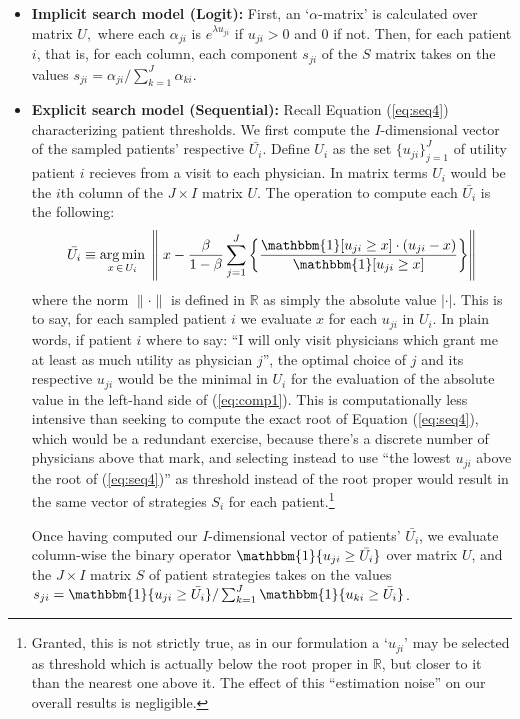 \documentclass[../main.tex]{subfiles}
\begin{document}
\begin{itemize}[itemsep=4pt, topsep=0pt]
    \item \textbf{Implicit search model (Logit):} First, an `$\alpha$-matrix' is calculated over matrix $U,$ where each $\alpha_{ji}$ is $e^{\lambda u_{ji}}$ if $u_{ji} > 0$ and $0$ if not. Then, for each patient $i$, that is, for each column, each component $s_{ji}$ of the $S$ matrix takes on the values $s_{ji} = \alpha_{ji}/\sum_{k = 1}^{J} \alpha_{ki}$.

    \item \textbf{Explicit search model (Sequential):} Recall Equation (\ref{eq:seq4}) characterizing patient thresholds. We first compute the $I$-dimensional vector of the sampled patients' respective $\bar{U_i}$. Define $U_i$ as the set $\{u_{ji}\}_{j=1}^{J}$ of utility patient $i$ recieves from a visit to each physician. In matrix terms $U_i$ would be the $i$th column of the $J \times I$ matrix $U$. The operation to compute each $\bar{U_i}$ is the following: \vspace{-0.5em}
    \begin{equation*}
    \bar{U_i} \equiv \argmin_{x \, \in \, U_i}\; \left\|  \; x - \frac{\beta}{1-\beta}  \sum_{j=1}^{J} \left\{ \frac{\mathbbm{1}[ u_{ji} \geq x ] \cdot (u_{ji} - x)}{\mathbbm{1}[ u_{ji} \geq x ]} \right\} \right\|
    \label{eq:comp1}
    \end{equation*}
    where the norm $\| \cdot \|$ is defined in $\mathbb{R}$ as simply the absolute value $| \cdot |$. This is to say, for each sampled patient $i$ we evaluate $x$ for each $u_{ji}$ in $U_i$. In plain words, if patient $i$ where to say: ``I will only visit physicians which grant me at least as much utility as physician $j$'', the optimal choice of $j$ and its respective $u_{ji}$ would be the minimal in $U_i$ for the evaluation of the absolute value in the left-hand side of (\ref{eq:comp1}). This is computationally less intensive than seeking to compute the exact root of Equation (\ref{eq:seq4}), which would be a redundant exercise, because there's a discrete number of physicians above that mark, and selecting instead to use ``the lowest $u_{ji}$ above the root of (\ref{eq:seq4})'' as threshold instead of the root proper would result in the same vector of strategies $S_i$ for each patient.\footnote{Granted, this is not strictly true, as in our formulation a `$u_{ji}$' may be selected as threshold which is actually below the root proper in $\mathbb{R}$, but closer to it than the nearest one above it. The effect of this ``estimation noise'' on our overall results is negligible.}

    Once having computed our $I$-dimensional vector of patients' $\bar{U_i}$, we evaluate column-wise the binary operator $\mathbbm{1}\{u_{ji}\geq \bar{U_i}\}$ over matrix $U$, and the $J \times I$ matrix $S$ of patient strategies takes on the values $s_{ji} = \mathbbm{1}\{u_{ji}\geq \bar{U_i}\} / \sum_{k=1}^{J} \mathbbm{1}\{u_{ki}\geq \bar{U_i}\}$.
\end{itemize}
\end{document}
